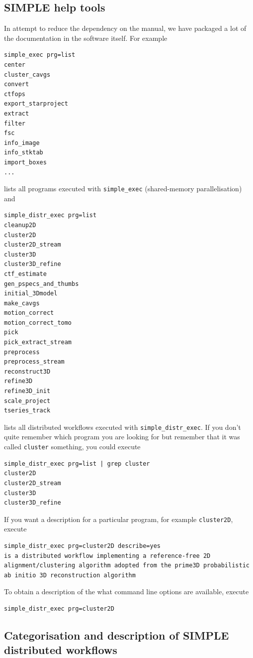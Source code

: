 \documentclass[a4paper,11pt]{article}
\newcommand{\prgname}[1]{\textcolor{NavyBlue}{\texttt{#1}}}
\begin{document}
\subsection{SIMPLE help tools}
In attempt to reduce the dependency on the manual, we have packaged a lot of the documentation in the software itself. For example
\begin{Verbatim}[commandchars=+\[\],fontsize=\small,breaklines=true]
simple_exec prg=list
center
cluster_cavgs
convert
ctfops
export_starproject
extract
filter
fsc
info_image
info_stktab
import_boxes
...
\end{Verbatim}
lists all programs executed with \texttt{simple\_exec} (shared-memory parallelisation) and
\begin{Verbatim}[commandchars=+\[\],fontsize=\small,breaklines=true]
simple_distr_exec prg=list
cleanup2D
cluster2D
cluster2D_stream
cluster3D
cluster3D_refine
ctf_estimate
gen_pspecs_and_thumbs
initial_3Dmodel
make_cavgs
motion_correct
motion_correct_tomo
pick
pick_extract_stream
preprocess
preprocess_stream
reconstruct3D
refine3D
refine3D_init
scale_project
tseries_track
\end{Verbatim}
lists all distributed workflows executed with \texttt{simple\_distr\_exec}. If you don't quite remember which program you are looking for but remember that it was called \texttt{cluster} something, you could execute
\begin{Verbatim}[commandchars=+\[\],fontsize=\small,breaklines=true]
simple_distr_exec prg=list | grep cluster
cluster2D
cluster2D_stream
cluster3D
cluster3D_refine
\end{Verbatim}
If you want a description for a particular program, for example \prgname{cluster2D}, execute
\begin{Verbatim}[commandchars=+\[\],fontsize=\small,breaklines=true]
simple_distr_exec prg=cluster2D describe=yes
is a distributed workflow implementing a reference-free 2D alignment/clustering algorithm adopted from the prime3D probabilistic ab initio 3D reconstruction algorithm
\end{Verbatim}
To obtain a description of the what command line options are available, execute
\begin{Verbatim}[commandchars=+\[\],fontsize=\small,breaklines=true]
simple_distr_exec prg=cluster2D
\end{Verbatim}

\subsection{Categorisation and description of SIMPLE distributed workflows}
\end{document}
